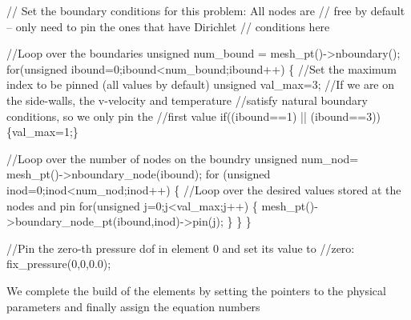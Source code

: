 \begin{DoxyCodeInclude}
 \textcolor{comment}{// Set the boundary conditions for this problem: All nodes are}
 \textcolor{comment}{// free by default -- only need to pin the ones that have Dirichlet }
 \textcolor{comment}{// conditions here}

 \textcolor{comment}{//Loop over the boundaries}
 \textcolor{keywordtype}{unsigned} num\_bound = mesh\_pt()->nboundary();
 \textcolor{keywordflow}{for}(\textcolor{keywordtype}{unsigned} ibound=0;ibound<num\_bound;ibound++)
  \{
   \textcolor{comment}{//Set the maximum index to be pinned (all values by default)}
   \textcolor{keywordtype}{unsigned} val\_max=3;
   \textcolor{comment}{//If we are on the side-walls, the v-velocity and temperature}
   \textcolor{comment}{//satisfy natural boundary conditions, so we only pin the}
   \textcolor{comment}{//first value}
   \textcolor{keywordflow}{if}((ibound==1) || (ibound==3)) \{val\_max=1;\}

   \textcolor{comment}{//Loop over the number of nodes on the boundry}
   \textcolor{keywordtype}{unsigned} num\_nod= mesh\_pt()->nboundary\_node(ibound);
   \textcolor{keywordflow}{for} (\textcolor{keywordtype}{unsigned} inod=0;inod<num\_nod;inod++)
    \{
     \textcolor{comment}{//Loop over the desired values stored at the nodes and pin}
     \textcolor{keywordflow}{for}(\textcolor{keywordtype}{unsigned} j=0;j<val\_max;j++)
      \{
       mesh\_pt()->boundary\_node\_pt(ibound,inod)->pin(j);
      \}
    \}
  \}

 \textcolor{comment}{//Pin the zero-th pressure dof in element 0 and set its value to}
 \textcolor{comment}{//zero:}
 fix\_pressure(0,0,0.0);

\end{DoxyCodeInclude}


We complete the build of the elements by setting the pointers to the physical parameters and finally assign the equation numbers


